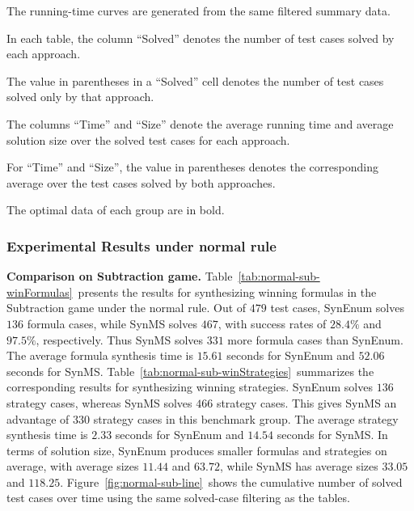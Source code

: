 \documentclass[review]{elsarticle}
\begin{document}
The running-time curves are generated from the same filtered summary data.

In each table, the column ``Solved'' denotes the number of test cases solved by each approach.

The value in parentheses in a ``Solved'' cell denotes the number of test cases solved only by that approach.

The columns ``Time'' and ``Size'' denote the average running time and average solution size over the solved test cases for each approach.

For ``Time'' and ``Size'', the value in parentheses denotes the corresponding average over the test cases solved by both approaches.

The optimal data of each group are in bold.

\subsubsection{Experimental Results under normal rule}

\textbf{Comparison on Subtraction game.}
Table~\ref{tab:normal-sub-winFormulas}~presents the results for synthesizing winning formulas in the Subtraction game under the normal rule.
Out of $479$ test cases, SynEnum solves $136$ formula cases, while SynMS solves $467$, with success rates of $28.4\%$ and $97.5\%$, respectively.
Thus SynMS solves $331$ more formula cases than SynEnum.
The average formula synthesis time is $15.61$ seconds for SynEnum and $52.06$ seconds for SynMS.
Table~\ref{tab:normal-sub-winStrategies}~summarizes the corresponding results for synthesizing winning strategies.
SynEnum solves $136$ strategy cases, whereas SynMS solves $466$ strategy cases.
This gives SynMS an advantage of $330$ strategy cases in this benchmark group.
The average strategy synthesis time is $2.33$ seconds for SynEnum and $14.54$ seconds for SynMS.
In terms of solution size, SynEnum produces smaller formulas and strategies on average, with average sizes $11.44$ and $63.72$, while SynMS has average sizes $33.05$ and $118.25$.
Figure~\ref{fig:normal-sub-line}~shows the cumulative number of solved test cases over time using the same solved-case filtering as the tables.
\end{document}
